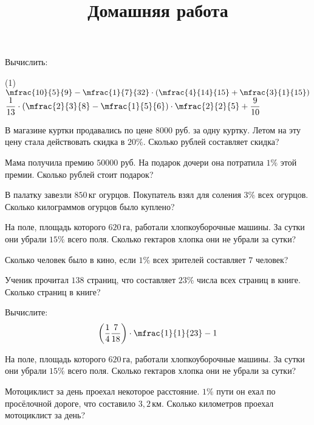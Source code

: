 %

\begin{class}[number=4]
	\begin{listofex}
		\item Вычислить:
		\begin{tasks}(1)
			\task \( \mfrac{10}{5}{9}-\mfrac{1}{7}{32}\cdot\left( \mfrac{4}{14}{15}+\mfrac{3}{1}{15} \right) \)
			\task \( \dfrac{1}{13}\cdot\left( \mfrac{2}{3}{8}-\mfrac{1}{5}{6} \right)\cdot\mfrac{2}{2}{5}+\dfrac{9}{10} \)
		\end{tasks}
		\item В магазине куртки продавались по цене \( 8 000 \) руб. за одну куртку. Летом на эту цену стала действовать скидка в \( 20\% \). Сколько рублей составляет скидка?
		\item Мама получила премию \( 50 000 \) руб. На подарок дочери она потратила \( 1\% \) этой премии. Сколько рублей стоит подарок?
		\item В палатку завезли \( 850 \) кг огурцов. Покупатель взял для соления \( 3\% \) всех огурцов. Сколько килограммов огурцов было куплено?
		\item На поле, площадь которого \( 620 \) га, работали хлопкоуборочные машины. За сутки они убрали \( 15\% \) всего поля. Сколько гектаров хлопка они не убрали за сутки?
		\item Сколько человек было в кино, если \( 1\% \) всех зрителей составляет \( 7 \) человек?
		\item Ученик прочитал \( 138 \) страниц, что составляет \( 23\% \) числа всех страниц в книге. Сколько страниц в книге?
	\end{listofex}
	\newpage
	\title{Домашняя работа}
	\begin{listofex}
		\item Вычислите:
		\[\left( \dfrac{1}{4}\dfrac{7}{18} \right)\cdot\mfrac{1}{1}{23}-1\]
		\item На поле, площадь которого \( 620 \) га, работали хлопкоуборочные машины. За сутки они убрали \( 15\% \) всего поля. Сколько гектаров хлопка они не убрали за сутки?
		\item Мотоциклист за день проехал некоторое расстояние. \( 1\% \) пути он ехал по просёлочной дороге, что составило \( 3,2 \) км. Сколько километров проехал мотоциклист за день?
	\end{listofex}
\end{class}

